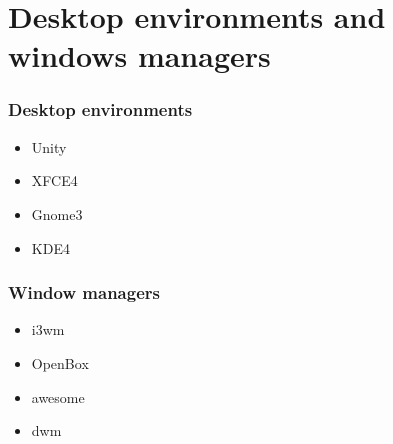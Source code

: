 \section{Desktop environments and windows managers}
\begin{frame}
    \frametitle{Desktop environments}
    \begin{itemize}
        \item<1 -> Unity
        \item<2 -> XFCE4
        \item<3 -> Gnome3
        \item<4 -> KDE4
    \end{itemize}
\end{frame}
\begin{frame}
    \frametitle{Window managers}
    \begin{itemize}
        \item<1 -> i3wm
        \item<2 -> OpenBox
        \item<3 -> awesome
        \item<4 -> dwm
    \end{itemize}
\end{frame}
